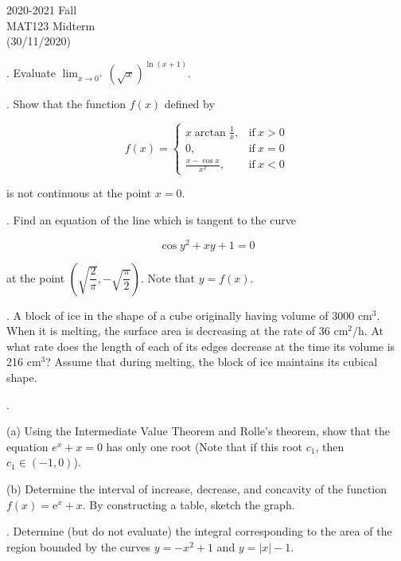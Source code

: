 \documentclass{article}
\begin{document}
\pagestyle{empty}
\large

\begin{center}
2020-2021 Fall\\MAT123 Midterm\\(30/11/2020)
\end{center}

. Evaluate $\displaystyle\lim_{x\to0^+}(\sqrt x)^{\ln(x+1)}$.

\hfill

. Show that the function $f(x)$ defined by

\[
f(x)=
\begin{cases}
\displaystyle x\arctan\frac{1}{x},&\text{if}\ x>0\\[1em]
0,&\text{if}\ x=0\\[1em]
\displaystyle \frac{x-\cos x}{x^2},&\text{if}\ x<0
\end{cases}
\]

\noindent is not continuous at the point $x=0$.

\hfill

. Find an equation of the line which is tangent to the curve

\[\cos y^2+xy+1=0\]

\noindent at the point $\left(\sqrt{\dfrac{2}{\pi}},-\sqrt{\dfrac{\pi}{2}} \right)$. Note that $y=f(x)$.

\hfill

. A block of ice in the shape of a cube originally having volume of $3000$ cm$^3$. When it is melting, the surface area is decreasing at the rate of 36 cm$^2$/h. At what rate does the length of each of its edges decrease at the time its volume is 216 cm$^3$? Assume that during melting, the block of ice maintains its cubical shape.

\hfill

.

\hfill

\noindent (a) Using the Intermediate Value Theorem and Rolle’s theorem, show that the equation $e^x + x = 0$ has only one root (Note that if this root $c_1$, then $c_1\in(-1,0)$).

\hfill

\noindent (b) Determine the interval of increase, decrease, and concavity of the function $f(x)=\mathrm e^x+x$. By constructing a table, sketch the graph.

\hfill

. Determine (but do not evaluate) the integral corresponding to the area of the region bounded by the curves $y=-x^2+1$ and $y =|x|-1$.
\end{document}
